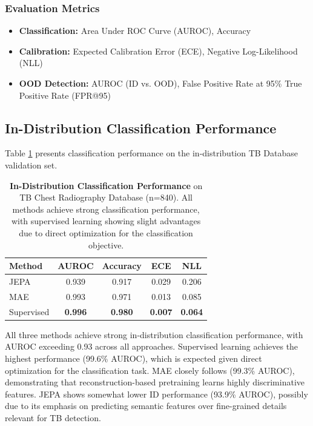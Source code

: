 \documentclass[11pt,a4paper]{article}
\begin{document}
\subsubsection{Evaluation Metrics}

\begin{itemize}[leftmargin=*]
    \item \textbf{Classification:} Area Under ROC Curve (AUROC), Accuracy
    \item \textbf{Calibration:} Expected Calibration Error (ECE), Negative Log-Likelihood (NLL)
    \item \textbf{OOD Detection:} AUROC (ID vs. OOD), False Positive Rate at 95\% True Positive Rate (FPR@95)
\end{itemize}

\subsection{In-Distribution Classification Performance}

Table \ref{tab:id_classification} presents classification performance on the in-distribution TB Database validation set.

\begin{table}[h]
\centering
\caption{\textbf{In-Distribution Classification Performance} on TB Chest Radiography Database (n=840). All methods achieve strong classification performance, with supervised learning showing slight advantages due to direct optimization for the classification objective.}
\label{tab:id_classification}
\begin{tabular}{@{}lcccc@{}}
\toprule
\textbf{Method} & \textbf{AUROC} & \textbf{Accuracy} & \textbf{ECE} & \textbf{NLL} \\
\midrule
JEPA & 0.939 & 0.917 & 0.029 & 0.206 \\
MAE & 0.993 & 0.971 & 0.013 & 0.085 \\
Supervised & \textbf{0.996} & \textbf{0.980} & \textbf{0.007} & \textbf{0.064} \\
\bottomrule
\end{tabular}
\end{table}

All three methods achieve strong in-distribution classification performance, with AUROC exceeding 0.93 across all approaches. Supervised learning achieves the highest performance (99.6\% AUROC), which is expected given direct optimization for the classification task. MAE closely follows (99.3\% AUROC), demonstrating that reconstruction-based pretraining learns highly discriminative features. JEPA shows somewhat lower ID performance (93.9\% AUROC), possibly due to its emphasis on predicting semantic features over fine-grained details relevant for TB detection.
\end{document}
